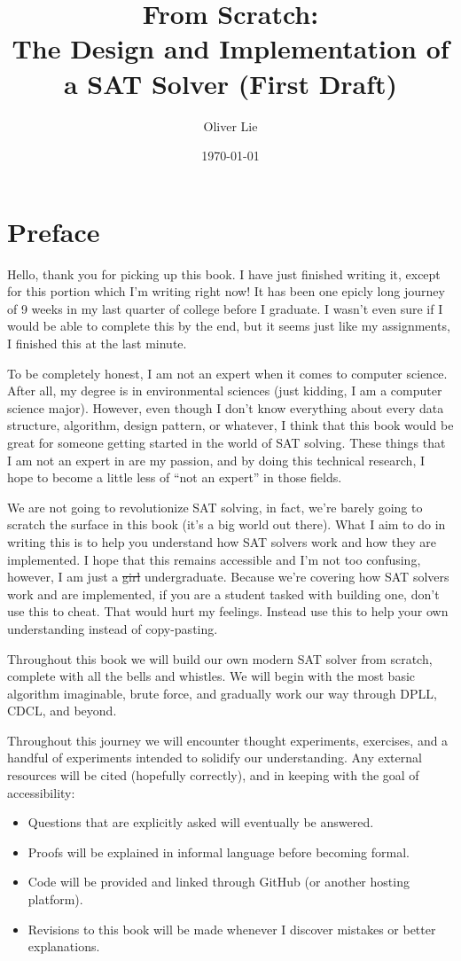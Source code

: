 \documentclass[oneside]{book}
\title{From Scratch:\\The Design and Implementation of a SAT Solver (First Draft)}
\author{Oliver Lie}
\date{\today}
\begin{document}
\maketitle

\tableofcontents

\chapter*{Preface}

Hello, thank you for picking up this book. I have just finished writing it, except for this 
portion which I'm writing right now! It has been one epicly long journey of 9 weeks in my 
last quarter of college before I graduate. I wasn't even sure if I would be able to complete 
this by the end, but it seems just like my assignments, I finished this at the last minute.

To be completely honest, I am not an expert when it comes to computer science. After all, 
my degree is in environmental sciences (just kidding, I am a computer science major).
However, even though I don't know everything about every data structure, algorithm, 
design pattern, or whatever, I think that this book would be great for someone getting 
started in the world of SAT solving. These things that I am not an expert in are my passion,
and by doing this technical research, I hope to become a little less of ``not an expert'' in 
those fields.

We are not going to revolutionize SAT solving, in fact, we're barely going to scratch the 
surface in this book (it's a big world out there). What I aim to do in writing this is to 
help you understand how SAT solvers work and how they are implemented. I hope that this 
remains accessible and I'm not too confusing, however, I am just a \sout{girl} undergraduate.
Because we're covering how SAT solvers work and are implemented, if you are a student tasked 
with building one, don't use this to cheat. That would hurt my feelings. Instead use this to 
help your own understanding instead of copy-pasting.

Throughout this book we will build our own modern SAT solver from scratch, 
complete with all the bells and whistles. We will begin with the most basic 
algorithm imaginable, brute force, and gradually work our way through DPLL, CDCL, 
and beyond.

Throughout this journey we will encounter thought experiments, exercises, and a
handful of experiments intended to solidify our understanding. Any external resources will 
be cited (hopefully correctly), and in keeping with the goal of accessibility:
\begin{itemize}
    \item Questions that are explicitly asked will eventually be answered.
    \item Proofs will be explained in informal language before becoming formal.
    \item Code will be provided and linked through GitHub (or another hosting platform).
    \item Revisions to this book will be made whenever I discover mistakes or better explanations.
\end{itemize}
\end{document}
